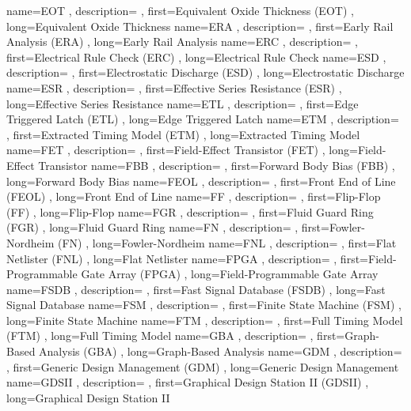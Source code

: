 { name={EOT}
, description={}
, first={Equivalent Oxide Thickness (EOT)}
, long={Equivalent Oxide Thickness}
}
{ name={ERA}
, description={}
, first={Early Rail Analysis (ERA)}
, long={Early Rail Analysis}
}
{ name={ERC}
, description={}
, first={Electrical Rule Check (ERC)}
, long={Electrical Rule Check}
}
{ name={ESD}
, description={}
, first={Electrostatic Discharge (ESD)}
, long={Electrostatic Discharge}
}
{ name={ESR}
, description={}
, first={Effective Series Resistance (ESR)}
, long={Effective Series Resistance}
}
{ name={ETL}
, description={}
, first={Edge Triggered Latch (ETL)}
, long={Edge Triggered Latch}
}
{ name={ETM}
, description={}
, first={Extracted Timing Model (ETM)}
, long={Extracted Timing Model}
}
{ name={FET}
, description={}
, first={Field-Effect Transistor (FET)}
, long={Field-Effect Transistor}
}
{ name={FBB}
, description={}
, first={Forward Body Bias (FBB)}
, long={Forward Body Bias}
}
{ name={FEOL}
, description={}
, first={Front End of Line (FEOL)}
, long={Front End of Line}
}
{ name={FF}
, description={}
, first={Flip-Flop (FF)}
, long={Flip-Flop}
}
{ name={FGR}
, description={}
, first={Fluid Guard Ring (FGR)}
, long={Fluid Guard Ring}
}
{ name={FN}
, description={}
, first={Fowler-Nordheim (FN)}
, long={Fowler-Nordheim}
}
{ name={FNL}
, description={}
, first={Flat Netlister (FNL)}
, long={Flat Netlister}
}
{ name={FPGA}
, description={}
, first={Field-Programmable Gate Array (FPGA)}
, long={Field-Programmable Gate Array}
}
{ name={FSDB}
, description={}
, first={Fast Signal Database (FSDB)}
, long={Fast Signal Database}
}
{ name={FSM}
, description={}
, first={Finite State Machine (FSM)}
, long={Finite State Machine}
}
{ name={FTM}
, description={}
, first={Full Timing Model (FTM)}
, long={Full Timing Model}
}
{ name={GBA}
, description={}
, first={Graph-Based Analysis (GBA)}
, long={Graph-Based Analysis}
}
{ name={GDM}
, description={}
, first={Generic Design Management (GDM)}
, long={Generic Design Management}
}
{ name={GDSII}
, description={}
, first={Graphical Design Station II (GDSII)}
, long={Graphical Design Station II}
}
